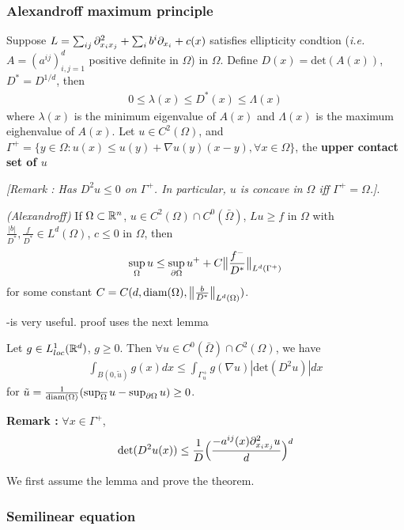 \documentclass[10pt,a4paper]{article}
\begin{document}
\subsubsection*{Alexandroff maximum principle}

Suppose $L = \sum_{ij} \partial^2_{x_i x_j} + \sum_{i} b^i \partial_{x_i} + c(x)$ satisfies ellipticity condtion (\textit{i.e.} $A = (a^{ij})_{i,j=1}^d$ positive definite in $\Omega$) in $\Omega$. Define $D(x) = \text{det}(A(x))$, $D^* = D^{1/d}$, then
\begin{align*}
0\leq \lambda(x) \leq D^*(x) \leq \Lambda(x)
\end{align*}
where $\lambda(x)$ is the minimum eigenvalue of $A(x)$ and $\Lambda(x)$ is the maximum eighenvalue of $A(x)$. Let $u\in C^2(\Omega)$, and $\Gamma^+ = \{y\in \Omega : u(x)\leq u(y) + \nabla u(y)(x-y), \forall x\in \Omega\}$, the \textbf{upper contact set of $u$}

\emph{[Remark : Has $D^2 u \leq 0$ on $\Gamma^+$. In particular, $u$ is concave in $\Omega$ iff $\Gamma^+ =\Omega$.]}.
\s

\thm \emph{(Alexandroff)} If $\Omega \subset \mathbb{R}^n$, $u\in C^2(\Omega) \cap C^0(\bar{\Omega})$, $Lu \geq f$ in $\Omega$ with $\frac{|b|}{D^*}, \frac{f}{D^*} \in L^d(\Omega)$, $c\leq 0$ in $\Omega$, then
\begin{align*}
\sup_{\Omega} u \leq \sup_{\partial \Omega} u^+ + C\bigl\lVert\frac{f^-}{D^*}\bigr\rVert_{L^d(\Gamma^+)}
\end{align*}
for some constant $C = C(d, \text{diam}(\Omega), \bigl\lVert\frac{b}{D^*}\bigr\rVert_{L^d(\Omega)})$.

-is very useful. proof uses the next lemma
\s

\lem Let $g \in L^1_{loc}(\mathbb{R}^d)$, $g\geq 0$. Then $\forall u \in C^0(\bar{\Omega}) \cap C^2(\Omega)$, we have
\begin{align*}
\int_{B(0, \tilde{u})}g(x) dx \leq \int_{\Gamma_{u}^+} g(\nabla u) |\text{det}(D^2 u)|dx
\end{align*}
for $\tilde{u} = \frac{1}{\text{diam}(\Omega)} (\sup_{\overline{\Omega}} u - \sup_{\partial \Omega} u) \geq 0$.
\s

\textbf{Remark :} $\forall x\in \Gamma^+$,
\begin{align*}
\text{det}(D^2u(x))\leq \frac{1}{D} \Big( \frac{-a^{ij}(x) \partial^2_{x_i x_j}u}{d}\Big)^d
\end{align*}
\s

We first assume the lemma and prove the theorem.

\subsubsection*{Semilinear equation}
\end{document}
